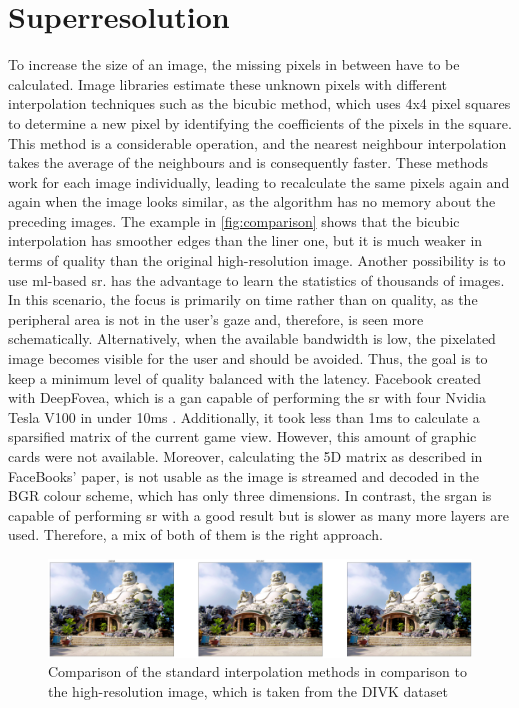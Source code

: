\section{Superresolution}\label{subsection:superresolution}
To increase the size of an image, the missing pixels in between have to be calculated. Image libraries estimate these unknown pixels with different interpolation techniques such as the bicubic method, which uses 4x4 pixel squares to determine a new pixel by identifying the coefficients of the pixels in the square. This method is a considerable operation, and the nearest neighbour interpolation takes the average of the neighbours and is consequently faster. These methods work for each image individually, leading to recalculate the same pixels again and again when the image looks similar, as the algorithm has no memory about the preceding images. The example in \autoref{fig:comparison} shows that the bicubic interpolation has smoother edges than the liner one, but it is much weaker in terms of quality than the original high-resolution image. Another possibility is to use \gls{ml}-based \gls{sr}.  has the advantage to learn the statistics of thousands of images. In this scenario, the focus is primarily on time rather than on quality, as the peripheral area is not in the user’s gaze and, therefore, is seen more schematically. Alternatively, when the available bandwidth is low, the pixelated image becomes visible for the user and should be avoided. Thus, the goal is to keep a minimum level of quality balanced with the latency. Facebook created with DeepFovea, which is a \gls{gan} capable of performing the \gls{sr} with four Nvidia Tesla V100 in under 10ms \parencite{Kaplanyan2019}. Additionally, it took less than 1ms to calculate a sparsified matrix of the current game view. However, this amount of graphic cards were not available. Moreover, calculating the 5D matrix as described in FaceBooks’ paper, is not usable as the image is streamed and decoded in the BGR colour scheme, which has only three dimensions. In contrast, the \gls{srgan} is capable of performing \gls{sr} with a good result but is slower as many more layers are used. Therefore, a mix of both of them is the right approach.


\begin{figure}[htbp]
    \includegraphics[width=\textwidth,height=\textheight,keepaspectratio]{logos/comparisonstandardresize.png}
     \caption{Comparison of the standard interpolation methods in comparison to the high-resolution image, which is taken from the DIVK dataset \parencite{Agustsson2017}}
    \label{fig:comparison}
\end{figure}

